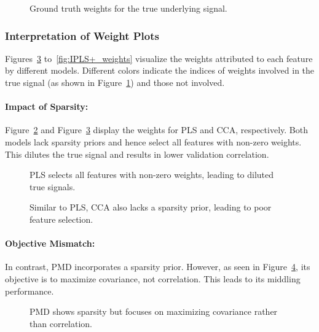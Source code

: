 \begin{figure}[h]
    \centering
    
    \caption{Ground truth weights for the true underlying signal.}
    \label{fig:True_weights}
\end{figure}

\subsubsection{Interpretation of Weight Plots}

Figures~\ref{fig:CCA_weights} to~\ref{fig:IPLS+_weights} visualize the weights attributed to each feature by different models.
Different colors indicate the indices of weights involved in the true signal (as shown in Figure~\ref{fig:True_weights}) and those not involved.

\paragraph{Impact of Sparsity:}
Figure~\ref{fig:PLS_weights} and Figure~\ref{fig:CCA_weights} display the weights for PLS and CCA, respectively.
Both models lack sparsity priors and hence select all features with non-zero weights.
This dilutes the true signal and results in lower validation correlation.

\begin{figure}[h]
    \centering
    
    \caption{PLS selects all features with non-zero weights, leading to diluted true signals.}
    \label{fig:PLS_weights}
\end{figure}

\begin{figure}[h]
    \centering
    
    \caption{ Similar to PLS, CCA also lacks a sparsity prior, leading to poor feature selection.}
    \label{fig:CCA_weights}
\end{figure}

\paragraph{Objective Mismatch:}
In contrast, PMD incorporates a sparsity prior. However, as seen in Figure~\ref{fig:PMD_weights}, its objective is to maximize covariance, not correlation. This leads to its middling performance.

\begin{figure}[h]
    \centering
    
    \caption{PMD shows sparsity but focuses on maximizing covariance rather than correlation.}
    \label{fig:PMD_weights}
\end{figure}

